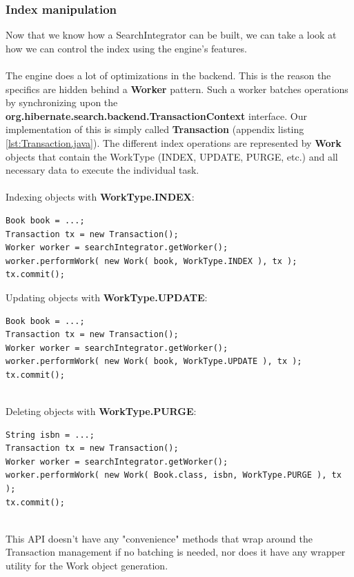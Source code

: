\subsubsection{Index manipulation}

Now that we know how a SearchIntegrator can be built, we can take a look at how we can control the index using the engine's features. 
\\\\
The engine does a lot of optimizations in the backend. This is the reason the specifics are hidden behind a \textbf{Worker} pattern. Such a worker batches operations by synchronizing upon the \textbf{org.hibernate.search.backend.TransactionContext} interface. Our implementation of this is simply called \textbf{Transaction} (appendix listing \ref{lst:Transaction.java}). The different index operations are represented by \textbf{Work} objects that contain the WorkType (INDEX, UPDATE, PURGE, etc.) and all necessary data to execute the individual task.
\\\\
Indexing objects with \textbf{WorkType.INDEX}:
\\
\lstset{language=java}
\begin{lstlisting}[frame=htrbl, caption={Indexing an object with the engine}, label={lst:indexing_object_native.java}]
Book book = ...;
Transaction tx = new Transaction();
Worker worker = searchIntegrator.getWorker();
worker.performWork( new Work( book, WorkType.INDEX ), tx );
tx.commit();
\end{lstlisting}

\pagebreak
\noindent
Updating objects with \textbf{WorkType.UPDATE}:
\\
\lstset{language=java}
\begin{lstlisting}[frame=htrbl, caption={Updating an object with the engine}, label={lst:updating_object_native.java}]
Book book = ...;
Transaction tx = new Transaction();
Worker worker = searchIntegrator.getWorker();
worker.performWork( new Work( book, WorkType.UPDATE ), tx );
tx.commit();
\end{lstlisting}
~\\
Deleting objects with \textbf{WorkType.PURGE}:
\\
\lstset{language=java}
\begin{lstlisting}[frame=htrbl, caption={Deleting an object by id with the engine}, label={lst:deleting_object_native.java}]
String isbn = ...;
Transaction tx = new Transaction();
Worker worker = searchIntegrator.getWorker();
worker.performWork( new Work( Book.class, isbn, WorkType.PURGE ), tx );
tx.commit();
\end{lstlisting}
~\\
This API doesn't have any "convenience" methods that wrap around the Transaction management if no batching is needed, nor does it have any wrapper utility for the Work object generation.

